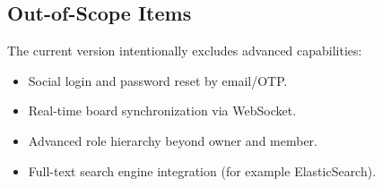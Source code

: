 \subsection{Out-of-Scope Items}

The current version intentionally excludes advanced capabilities:
\begin{itemize}
    \item Social login and password reset by email/OTP.
    \item Real-time board synchronization via WebSocket.
    \item Advanced role hierarchy beyond owner and member.
    \item Full-text search engine integration (for example ElasticSearch).
\end{itemize}
